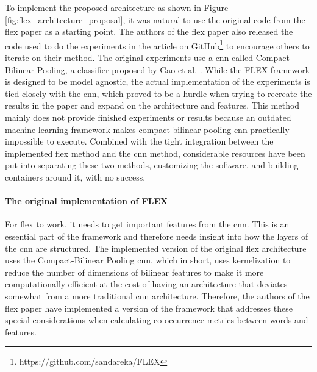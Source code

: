             To implement the proposed architecture as shown in Figure \ref{fig:flex_architecture_proposal}, it was natural to use the original code from the \gls{flex} paper as a starting point.
            The authors of the \gls{flex} paper also released the code used to do the experiments in the article on GitHub\footnote{https://github.com/sandareka/FLEX} to encourage others to iterate on their method. The original experiments use a \gls{cnn} called Compact-Bilinear Pooling, a classifier proposed by Gao et al. \cite{gaoCompactBilinearPooling2016}. While the FLEX framework is designed to be model agnostic, the actual implementation of the experiments is tied closely with the \gls{cnn}, which proved to be a hurdle when trying to recreate the results in the paper and expand on the architecture and features. 
            This method mainly does not provide finished experiments or results because an outdated machine learning framework makes compact-bilinear pooling \gls{cnn} practically impossible to execute. 
            Combined with the tight integration between the implemented \gls{flex} method and the \gls{cnn} method, considerable resources have been put into separating these two methods, customizing the software, and building containers around it, with no success.
    
            
            \paragraph{The original implementation of FLEX\\}
            For \gls{flex} to work, it needs to get important features from the \gls{cnn}. This is an essential part of the framework and therefore needs insight into how the layers of the \gls{cnn} are structured.
            The implemented version of the original \gls{flex} architecture uses the Compact-Bilinear Pooling \gls{cnn}, which in short, uses kernelization to reduce the number of dimensions of bilinear features to make it more computationally efficient at the cost of having an architecture that deviates somewhat from a more traditional \gls{cnn} architecture. Therefore, the authors of the \gls{flex} paper have implemented a version of the framework that addresses these special considerations when calculating co-occurrence metrics between words and features. 
        


